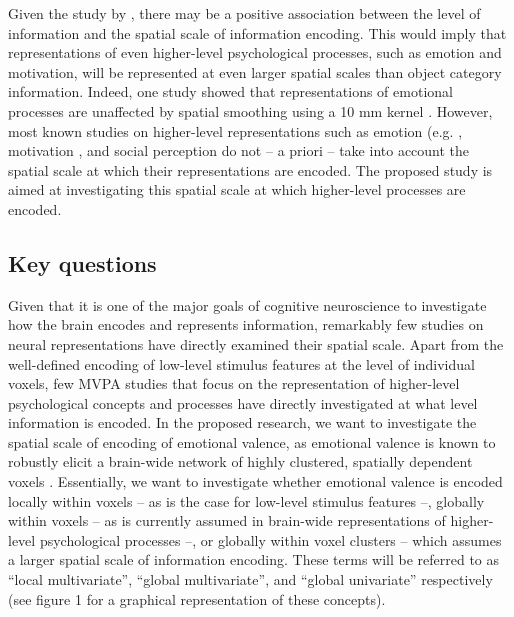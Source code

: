 \documentclass[12pt,a4paper]{article}\usepackage[]{graphicx}\usepackage[]{color}
\begin{document}
Given the study by \cite{brants2011}, there may be a positive association between the level of information and the spatial scale of information encoding. This would imply that representations of even higher-level psychological processes, such as emotion and motivation, will be represented at even larger spatial scales than object category information. Indeed, one study showed that representations of emotional processes are unaffected by spatial smoothing using a 10 mm kernel \citep{oosterwijk2015}. However, most known studies on higher-level representations such as emotion (e.g. \citealp{kassam2013,baucom2012}, motivation \cite{etzel2015}, and social perception \citep{corradi2014,chavez2015} do not -- a priori -- take into account the spatial scale at which their representations are encoded. The proposed study is aimed at investigating this spatial scale at which higher-level processes are encoded.       

\subsection{Key questions}

Given that it is one of the major goals of cognitive neuroscience to investigate how the brain encodes and represents information, remarkably few studies on neural representations have directly examined their spatial scale. Apart from the well-defined encoding of low-level stimulus features at the level of individual voxels, few MVPA studies that focus on the representation of higher-level psychological concepts and processes have directly investigated at what level information is encoded. In the proposed research, we want to investigate the spatial scale of encoding of emotional valence, as emotional valence is known to robustly elicit a brain-wide network of highly clustered, spatially dependent voxels \citep{lindquist2015,chavez2015,kassam2013}. Essentially, we want to investigate whether emotional valence is encoded locally within voxels -- as is the case for low-level stimulus features --, globally within voxels -- as is currently assumed in brain-wide representations of higher-level psychological processes --, or globally within voxel clusters -- which assumes a larger spatial scale of information encoding. These terms will be referred to as ``local multivariate'', ``global multivariate'', and ``global univariate'' respectively (see figure 1 for a graphical representation of these concepts).       
\end{document}
